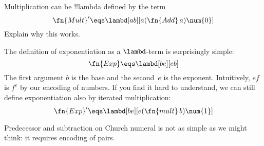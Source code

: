 \documentclass[../../../include/open-logic-section]{subfiles}
\begin{document}
\begin{prob}
Multiplication can be !!{lambda define}d by the term
\[
  \fn{Mult}' \eqs \lambd[ab][a (\fn{Add}\, a) \num{0}]
\]
Explain why this works.
\end{prob}

The definition of exponentiation as a $\lambd$-term is
surprisingly simple:
\[
  \fn{Exp} \eqs \lambd[be][e b]
\]
The first argument $b$ is the base and the second~$e$ is the exponent.
Intuitively, $e f$ is $f^e$ by our encoding of numbers. If you find it
hard to understand, we can still define exponentiation also by
iterated multiplication:
\[
  \fn{Exp}' \eqs \lambd[be][e (\fn{mult}\, b) \num{1}]
\]

Predecessor and subtraction on Church numeral is not as simple as we
might think: it requires encoding of pairs.
\end{document}

